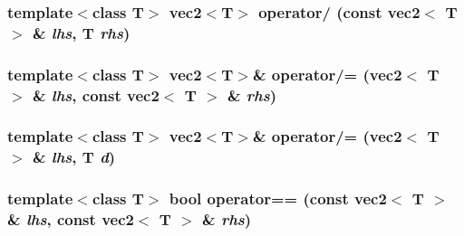 \hypertarget{classnv_1_1vec2_20e8cedd23c85b5a733b29d9216823eb}{
\subsubsection[{operator/}]{\setlength{\rightskip}{0pt plus 5cm}template$<$class T$>$ {\bf vec2}$<$T$>$ operator/ (const {\bf vec2}$<$ T $>$ \& {\em lhs}, \/  T {\em rhs})}}
\label{classnv_1_1vec2_20e8cedd23c85b5a733b29d9216823eb}


\hypertarget{classnv_1_1vec2_3939b33baf1bb44242757a4b91ffacdd}{
\subsubsection[{operator/=}]{\setlength{\rightskip}{0pt plus 5cm}template$<$class T$>$ {\bf vec2}$<$T$>$\& operator/= ({\bf vec2}$<$ T $>$ \& {\em lhs}, \/  const {\bf vec2}$<$ T $>$ \& {\em rhs})}}
\label{classnv_1_1vec2_3939b33baf1bb44242757a4b91ffacdd}


\hypertarget{classnv_1_1vec2_e4010436401845819ae1c987802d08a7}{
\subsubsection[{operator/=}]{\setlength{\rightskip}{0pt plus 5cm}template$<$class T$>$ {\bf vec2}$<$T$>$\& operator/= ({\bf vec2}$<$ T $>$ \& {\em lhs}, \/  T {\em d})}}
\label{classnv_1_1vec2_e4010436401845819ae1c987802d08a7}


\hypertarget{classnv_1_1vec2_783e39d62df5ebca6654640dd95b6f54}{
\subsubsection[{operator==}]{\setlength{\rightskip}{0pt plus 5cm}template$<$class T$>$ bool operator== (const {\bf vec2}$<$ T $>$ \& {\em lhs}, \/  const {\bf vec2}$<$ T $>$ \& {\em rhs})}}
\label{classnv_1_1vec2_783e39d62df5ebca6654640dd95b6f54}




